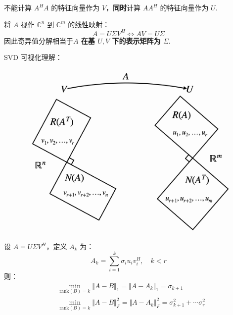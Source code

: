 \begin{note}
不能计算 $A^HA$ 的特征向量作为 $V$，\textbf{同时}计算 $AA^H$ 的特征向量作为 $U$.
\end{note}

\begin{remark}
将 $A$ 视作 $\mathbb C^n$ 到 $\mathbb C^m$ 的线性映射：
\[
    A=U\Sigma V^H\iff AV=U\Sigma
\]
因此奇异值分解相当于\textbf{$A$ 在基 $U,V$ 下的表示矩阵为 $\Sigma$}.
\end{remark}

\begin{remark}
SVD 可视化理解：
\begin{figure}[H]
    \centering
    \includegraphics[width=0.5\linewidth]{figs/SVDmap.png}
\end{figure}
\end{remark}

\begin{theorem}[秩 $k$ 最佳逼近]
设 $A=U\Sigma V^H$，定义 $A_k$ 为：
\[
    A_k=\sum_{i=1}^k\sigma_iu_iv_i^H,\quad k<r
\]
则：
\begin{align*}
    &\min_{\text{rank}(B)=k}\Vert A-B\Vert_1=\Vert A-A_k\Vert_1=\sigma_{k+1}\\
    &\min_{\text{rank}(B)=k}\Vert A-B\Vert_F^2=\Vert A-A_k\Vert_F^2=\sigma_{k+1}^2+\cdots\sigma_{r}^2
\end{align*}
\end{theorem}

